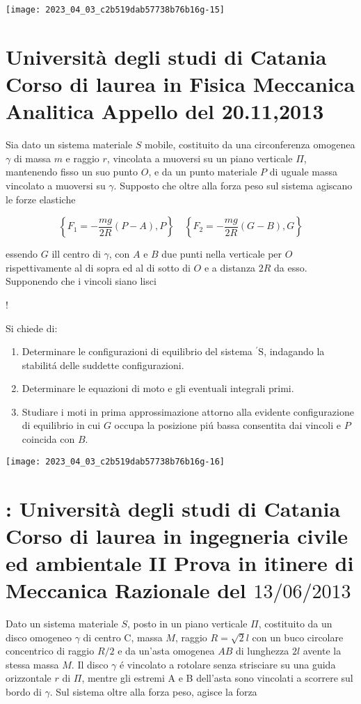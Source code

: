 \documentclass[10pt]{article}
\begin{document}
\begin{center}
\texttt{[image: 2023\_04\_03\_c2b519dab57738b76b16g-15]}
\end{center}

\section{Università degli studi di Catania
Corso di laurea in Fisica
Meccanica Analitica
Appello del 20.11,2013}
Sia dato un sistema materiale \(S\) mobile, costituito da una circonferenza omogenea \(\gamma\) di massa \(m\) e raggio \(r\), vincolata a muoversi su un piano verticale \(\Pi\), mantenendo fisso un suo punto \(O\), e da un punto materiale \(P\) di uguale massa vincolato a muoversi su \(\gamma\). Supposto che oltre alla forza peso sul sistema agiscano le forze elastiche

\[
\left\{F_{1}=-\frac{m g}{2 R}(P-A), P\right\} \quad\left\{F_{2}=-\frac{m g}{2 R}(G-B), G\right\}
\]

essendo \(G\) ill centro di \(\gamma\), con \(A\) e \(B\) due punti nella verticale per \(O\) rispettivamente al di sopra ed al di sotto di \(O\) e a distanza \(2 R\) da esso. Supponendo che i vincoli siano lisci

!

Si chiede di:

\begin{enumerate}
  \item Determinare le configurazioni di equilibrio del sistema \({ }^{\prime} \mathrm{S}\), indagando la stabilitá delle suddette configurazioni.

  \item Determinare le equazioni di moto e gli eventuali integrali primi.

  \item Studiare i moti in prima approssimazione attorno alla evidente configurazione di equilibrio in cui \(G\) occupa la posizione piú bassa consentita dai vincoli e \(P\) coincida con \(B\).

\end{enumerate}

\begin{center}
\texttt{[image: 2023\_04\_03\_c2b519dab57738b76b16g-16]}
\end{center}

\section{: Università degli studi di Catania
Corso di laurea in ingegneria civile ed ambientale
II Prova in itinere di Meccanica Razionale del \(13 / 06 / 2013\)}
Dato un sistema materiale \(S\), posto in un piano verticale \(\Pi\), costituito da un disco omogeneo \(\gamma\) di centro \(\mathrm{C}\), massa \(M\), raggio \(R=\sqrt{2} l\) con un buco circolare concentrico di raggio \(R / 2\) e da un'asta omogenea \(A B\) di lunghezza \(2 l\) avente la stessa massa \(M\). Il disco \(\gamma\) é vincolato a rotolare senza strisciare su una guida orizzontale \(r\) di \(\Pi\), mentre gli estremi A e B dell'asta sono vincolati a scorrere sul bordo di \(\gamma\). Sul sistema oltre alla forza peso, agisce la forza
\end{document}
